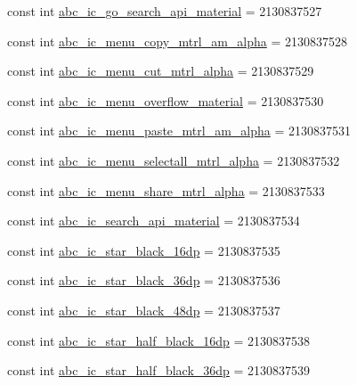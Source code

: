 \begin{CompactItemize}
\item 
const int \hyperlink{class__2doo_1_1_droid_1_1_resource_1_1_drawable_3ba1b10467e63de096e490aaf5a66e6d}{abc\_\-ic\_\-go\_\-search\_\-api\_\-material} = 2130837527
\item 
const int \hyperlink{class__2doo_1_1_droid_1_1_resource_1_1_drawable_49d896385a3b6bee3949eb1614922741}{abc\_\-ic\_\-menu\_\-copy\_\-mtrl\_\-am\_\-alpha} = 2130837528
\item 
const int \hyperlink{class__2doo_1_1_droid_1_1_resource_1_1_drawable_3435997c77754d6578b4ec9657af5658}{abc\_\-ic\_\-menu\_\-cut\_\-mtrl\_\-alpha} = 2130837529
\item 
const int \hyperlink{class__2doo_1_1_droid_1_1_resource_1_1_drawable_32482f7aae0f69c2310bf1c70ecb1b89}{abc\_\-ic\_\-menu\_\-overflow\_\-material} = 2130837530
\item 
const int \hyperlink{class__2doo_1_1_droid_1_1_resource_1_1_drawable_fb843a9cdca0e74479580d1c6122fe16}{abc\_\-ic\_\-menu\_\-paste\_\-mtrl\_\-am\_\-alpha} = 2130837531
\item 
const int \hyperlink{class__2doo_1_1_droid_1_1_resource_1_1_drawable_ba9fc1ed4f510622e5c72afdbedc80e5}{abc\_\-ic\_\-menu\_\-selectall\_\-mtrl\_\-alpha} = 2130837532
\item 
const int \hyperlink{class__2doo_1_1_droid_1_1_resource_1_1_drawable_3ae8ca8afbe8c5d12a51d10991e48ffb}{abc\_\-ic\_\-menu\_\-share\_\-mtrl\_\-alpha} = 2130837533
\item 
const int \hyperlink{class__2doo_1_1_droid_1_1_resource_1_1_drawable_4b4c16690bfa331f6273c32c69a787f4}{abc\_\-ic\_\-search\_\-api\_\-material} = 2130837534
\item 
const int \hyperlink{class__2doo_1_1_droid_1_1_resource_1_1_drawable_5f64e84de491857704a5c56ae46fc011}{abc\_\-ic\_\-star\_\-black\_\-16dp} = 2130837535
\item 
const int \hyperlink{class__2doo_1_1_droid_1_1_resource_1_1_drawable_3fbc4bc8aecdcdf3924b74353e7f441f}{abc\_\-ic\_\-star\_\-black\_\-36dp} = 2130837536
\item 
const int \hyperlink{class__2doo_1_1_droid_1_1_resource_1_1_drawable_a68c94db485b7b9a25c1b6ba951c6671}{abc\_\-ic\_\-star\_\-black\_\-48dp} = 2130837537
\item 
const int \hyperlink{class__2doo_1_1_droid_1_1_resource_1_1_drawable_ea40be8803fddfdda7e090d3ef7e0406}{abc\_\-ic\_\-star\_\-half\_\-black\_\-16dp} = 2130837538
\item 
const int \hyperlink{class__2doo_1_1_droid_1_1_resource_1_1_drawable_d71c03e8f5ca27e1025657b26a3e3938}{abc\_\-ic\_\-star\_\-half\_\-black\_\-36dp} = 2130837539

\end{CompactItemize}
